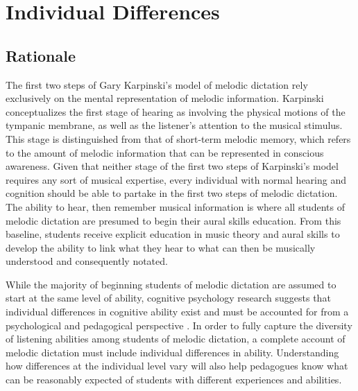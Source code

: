 \documentclass[12pt,]{book}
\begin{document}
\hypertarget{individual-differences}{%
\chapter{Individual Differences}\label{individual-differences}}

\hypertarget{rationale-1}{%
\section{Rationale}\label{rationale-1}}

The first two steps of Gary Karpinski's model of melodic dictation \citep{karpinskiAuralSkillsAcquisition2000, karpinskiModelMusicPerception1990} rely exclusively on the mental representation of melodic information.
Karpinski conceptualizes the first stage of hearing as involving the physical motions of the tympanic membrane, as well as the listener's attention to the musical stimulus.
This stage is distinguished from that of short-term melodic memory, which refers to the amount of melodic information that can be represented in conscious awareness.
Given that neither stage of the first two steps of Karpinski's model requires any sort of musical expertise, every individual with normal hearing and cognition should be able to partake in the first two steps of melodic dictation.
The ability to hear, then remember musical information is where all students of melodic dictation are presumed to begin their aural skills education.
From this baseline, students receive explicit education in music theory and aural skills to develop the ability to link what they hear to what can then be musically understood and consequently notated.

While the majority of beginning students of melodic dictation are assumed to start at the same level of ability, cognitive psychology research suggests that individual differences in cognitive ability exist and must be accounted for from a psychological and pedagogical perspective \citep{cowanWorkingMemoryCapacity2005, ritchieIntelligenceAllThat2015}.
In order to fully capture the diversity of listening abilities among students of melodic dictation, a complete account of melodic dictation must include individual differences in ability.
Understanding how differences at the individual level vary will also help pedagogues know what can be reasonably expected of students with different experiences and abilities.
\end{document}
